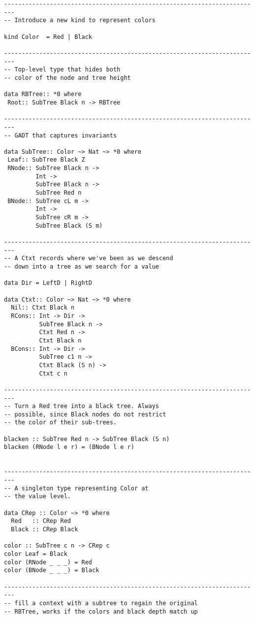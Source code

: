 \documentclass[11pt,twoside,A4]{llncs}
\begin{document}
{\small
\begin{verbatim}
-------------------------------------------------------------------------
-- Introduce a new kind to represent colors

kind Color  = Red | Black

-------------------------------------------------------------------------
-- Top-level type that hides both 
-- color of the node and tree height

data RBTree:: *0 where
 Root:: SubTree Black n -> RBTree

-------------------------------------------------------------------------
-- GADT that captures invariants

data SubTree:: Color ~> Nat ~> *0 where
 Leaf:: SubTree Black Z
 RNode:: SubTree Black n ->
         Int ->
         SubTree Black n ->
         SubTree Red n
 BNode:: SubTree cL m ->
         Int ->
         SubTree cR m ->
         SubTree Black (S m)

-------------------------------------------------------------------------
-- A Ctxt records where we've been as we descend 
-- down into a tree as we search for a value

data Dir = LeftD | RightD

data Ctxt:: Color ~> Nat ~> *0 where
  Nil:: Ctxt Black n
  RCons:: Int -> Dir ->
          SubTree Black n ->
          Ctxt Red n ->
          Ctxt Black n
  BCons:: Int -> Dir ->
          SubTree c1 n ->
          Ctxt Black (S n) ->
          Ctxt c n

-------------------------------------------------------------------------
-- Turn a Red tree into a black tree. Always
-- possible, since Black nodes do not restrict
-- the color of their sub-trees.

blacken :: SubTree Red n -> SubTree Black (S n)
blacken (RNode l e r) = (BNode l e r)


-------------------------------------------------------------------------
-- A singleton type representing Color at
-- the value level.

data CRep :: Color ~> *0 where
  Red   :: CRep Red
  Black :: CRep Black

color :: SubTree c n -> CRep c
color Leaf = Black
color (RNode _ _ _) = Red
color (BNode _ _ _) = Black

-------------------------------------------------------------------------
-- fill a context with a subtree to regain the original 
-- RBTree, works if the colors and black depth match up


\end{verbatim}}
\end{document}
